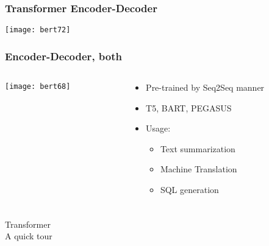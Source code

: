 \begin{frame}[fragile]\frametitle{Transformer Encoder-Decoder}

			\begin{center}
			\texttt{[image: bert72]}
			\end{center}		

			
\end{frame}
\begin{frame}[fragile]\frametitle{Encoder-Decoder, both}

\begin{columns}
    \begin{column}[T]{0.5\linewidth}
			\begin{center}
			\texttt{[image: bert68]}
			\end{center}		
		\end{column}
    \begin{column}[T]{0.5\linewidth}
      \begin{itemize}
			\item Pre-trained by Seq2Seq manner
			\item T5, BART, PEGASUS
			\item Usage:
      \begin{itemize}
			\item Text summarization
			\item Machine Translation
			\item SQL generation
			\end{itemize}
			\end{itemize}
    \end{column}
  \end{columns}
			
\end{frame}

\begin{frame}[fragile]\frametitle{}
\begin{center}
{\Large Transformer \\ \small A quick tour}
\end{center}
\end{frame}


